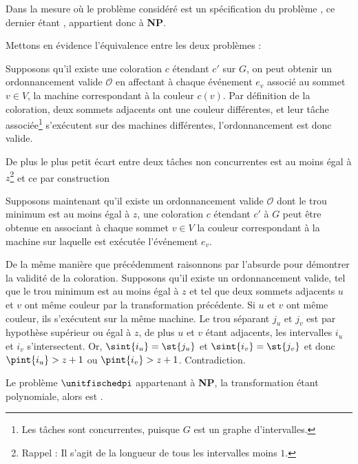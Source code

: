 \documentclass[a4paper,9pt]{report}
\begin{document}
Dans la mesure où le problème considéré est un spécification du problème \fischedpi, ce dernier
étant \npc, \unitfischedpi appartient donc à \textbf{NP}.

Mettons en évidence l'équivalence entre les deux problèmes :
\begin{bitemize}
    \item Supposons qu'il existe une coloration $c$ étendant $c'$ sur $G$, on peut obtenir un
        ordonnancement valide $\mathcal{O}$ en affectant à chaque événement $e_v$ associé au sommet
        $v \in V$, la machine correspondant à la couleur $c(v)$. Par définition de la coloration,
        deux sommets adjacents ont une couleur différentes, et leur tâche associée\footnote{Les
        tâches sont concurrentes, puisque $G$ est un graphe d'intervalles.} s'exécutent sur des
        machines différentes, l'ordonnancement est donc valide. 

        De plus le plus petit écart entre deux tâches non concurrentes est au moins égal à
        $z$\footnote{Rappel : Il s'agit de la longueur de tous les intervalles moins $1$.} et ce par
        construction
    \item Supposons maintenant qu'il existe un ordonnancement valide $\mathcal{O}$ dont le trou
        minimum est au moins égal à $z$, une coloration $c$ étendant $c'$ à $G$ peut être obtenue en
        associant à chaque sommet $v \in V$ la couleur correspondant à la machine sur laquelle est
        exécutée l'événement $e_v$.

        De la même manière que précédemment raisonnons par l'absurde pour démontrer la validité de
        la coloration. Supposons qu'il existe un ordonnancement valide, tel que le trou minimum est
        au moins égal à $z$ et tel que deux sommets adjacents $u$ et $v$ ont même couleur par la
        transformation précédente. Si $u$ et $v$ ont même couleur, ils s'exécutent sur la même
        machine. Le trou séparant $j_u$ et $j_v$ est par hypothèse supérieur ou égal à $z$, de plus
        $u$ et $v$ étant adjacents, les intervalles $i_u$ et $i_v$ s'intersectent. Or, $\sint{i_u} =
        \st{j_u}$ et $\sint{i_v} = \st{j_v}$ et donc $\pint{i_u} > z+1$ ou $\pint{i_v} > z+1$.
        Contradiction.
\end{bitemize}

Le problème $\unitfischedpi$ appartenant à \textbf{NP}, la transformation étant polynomiale, alors
\unitfischedpi est \npc.
\end{document}
